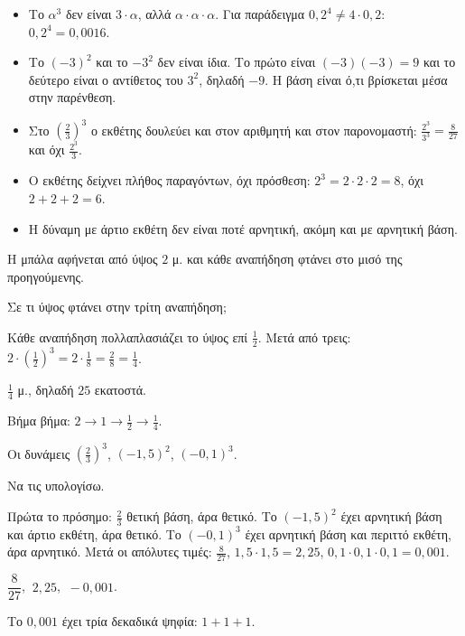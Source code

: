 \begin{prosoxi}
\begin{itemize}[leftmargin=1.2em,itemsep=0.3ex,topsep=2pt]
\item Το $\alpha^{3}$ δεν είναι $3\cdot\alpha$, αλλά $\alpha\cdot\alpha\cdot\alpha$. Για παράδειγμα $0{,}2^4\neq4\cdot0{,}2$: $0{,}2^4=0{,}0016$.
\item Το $(-3)^2$ και το $-3^2$ δεν είναι ίδια. Το πρώτο είναι $(-3)(-3)=9$ και το δεύτερο είναι ο αντίθετος του $3^2$, δηλαδή $-9$. Η βάση είναι ό,τι βρίσκεται μέσα στην παρένθεση.
\item Στο $\left(\frac{2}{3}\right)^3$ ο εκθέτης δουλεύει και στον αριθμητή και στον παρονομαστή: $\frac{2^3}{3^3}=\frac{8}{27}$ και όχι $\frac{2^3}{3}$.
\item Ο εκθέτης δείχνει πλήθος παραγόντων, όχι πρόσθεση: $2^3=2\cdot2\cdot2=8$, όχι $2+2+2=6$.
\item Η δύναμη με άρτιο εκθέτη δεν είναι ποτέ αρνητική, ακόμη και με αρνητική βάση.
\end{itemize}
\end{prosoxi}


\tixero Η μπάλα αφήνεται από ύψος $2$ μ. και κάθε αναπήδηση φτάνει στο μισό της προηγούμενης.\par
\tithelo Σε τι ύψος φτάνει στην τρίτη αναπήδηση;\par
\possindeo Κάθε αναπήδηση πολλαπλασιάζει το ύψος επί $\frac{1}{2}$. Μετά από τρεις: $2\cdot\left(\frac{1}{2}\right)^3=2\cdot\frac{1}{8}=\frac{2}{8}=\frac{1}{4}$.\par
\apantisi $\frac{1}{4}$ μ., δηλαδή $25$ εκατοστά.\par
\elegxos Βήμα βήμα: $2\to1\to\frac{1}{2}\to\frac{1}{4}$.

\tixero Οι δυνάμεις $\left(\frac{2}{3}\right)^3$, $(-1{,}5)^2$, $(-0{,}1)^3$.\par
\tithelo Να τις υπολογίσω.\par
\possindeo Πρώτα το πρόσημο: $\frac{2}{3}$ θετική βάση, άρα θετικό. Το $(-1{,}5)^2$ έχει αρνητική βάση και άρτιο εκθέτη, άρα θετικό. Το $(-0{,}1)^3$ έχει αρνητική βάση και περιττό εκθέτη, άρα αρνητικό. Μετά οι απόλυτες τιμές: $\frac{8}{27}$, $1{,}5\cdot1{,}5=2{,}25$, $0{,}1\cdot0{,}1\cdot0{,}1=0{,}001$.\par
\apantisi $\dfrac{8}{27}$, $\ 2{,}25$, $\ -0{,}001$.\par
\elegxos Το $0{,}001$ έχει τρία δεκαδικά ψηφία: $1+1+1$.

